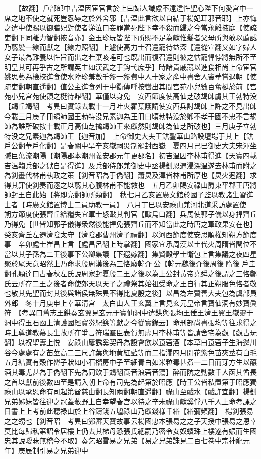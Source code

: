 　　【故翻】戶部郎中吉温因宦官言於上曰婦人識慮不遠違忤聖心陛下何愛宫中一席之地不使之就死豈忍辱之於外舍邪【吉温此言欲以自結于楊妃耳邪音耶】上亦悔之遣中使賜以御膳妃對使者涕泣曰妾罪當死陛下幸不殺而歸之今當永離掖庭【使疏吏翻下同離力智翻掖音亦】金玉珍玩皆陛下所賜不足為獻惟髪者父母所與敢以薦誠乃翦髪一繚而獻之【繚力照翻】上遽使高力士召還寵待益深【還從宣翻又如字婦人女子最為難養以忤旨而出之若棄咳唾可也既出而復召還則彼之怙寵悍悖將無所不至明皇其可再乎古之所謂英主如漢武之于鈎弋庶乎】時諸貴戚競以進食相尚上命宦官姚思藝為檢校進食使水陸珍羞數千盤一盤費中人十家之產中書舍人竇華嘗退朝【使疏吏翻朝直遥翻】值公主進食列于中衢傳呼按轡出其間宫苑小兒數百奮梃於前【宫苑小兒宫苑使領之梃待鼎翻】華僅以身免　安西節度使高仙芝破朅師虜其王勃特没【朅丘竭翻　考異曰實錄去載十一月吐火羅葉護請使安西兵討朅師上許之不見出師今載三月庚子冊朅師國王勃特没兄素迦為王冊曰頃勃特没於卿不孝于國不忠不言朅師為誰所破按十載正月高仙芝擒朅師王來獻然則朅師為仙芝所破也】三月庚子立勃特没之兄素迦為朅師王【迦音加】　上命御史大夫王鉷鑿華山路設壇場于其上【鉷戶公翻華戶化翻】是春關中旱辛亥嶽祠災制罷封西嶽　夏四月己巳御史大夫宋渾坐贓巨萬流潮陽【潮陽郡本潮州義安郡元年更郡名】初吉温因李林甫得進【天寶四載吉温鞫兵部之獄自是得進】及兵部侍郎兼御史中丞楊釗恩遇浸深温遂去林甫而附之為釗畫代林甫執政之策【釗音昭為于偽翻】蕭炅及渾皆林甫所厚也【炅火迥翻】求得其罪使釗奏而逐之以翦其心腹林甫不能救也　五月乙卯賜安祿山爵東平郡王唐將帥封王自此始【將即亮翻帥所類翻】　秋七月乙亥置廣文館於國子監以教諸生習進士者【時廣文館置博士二員助教一員】　八月丁巳以安祿山兼河北道采訪處置使　朔方節度使張齊丘給糧失宜軍士怒敺其判官【敺烏口翻】兵馬使郭子儀以身捍齊丘乃得免【世皆知郭子儀得衆然後能捍免張齊丘而不知當此之時唐之軍政果安在也】癸亥齊丘左遷濟陰太守【濟陰郡曹州濟子禮翻】以河西節度使安思順權知朔方節度事　辛卯處士崔昌上言【處昌呂翻上時掌翻】國家宜承周漢以土代火周隋皆閏位不當以其子孫為二王後事下公卿集議【下遐嫁翻】集賢殿學士衛包上言集議之夜四星聚於尾天意昭然上乃命求殷周漢後為三恪廢韓介公【韓元魏後介後周後隋後戶圭翻孔穎達曰古春秋左氏說周家封夏殷二王之後以為上公封黃帝堯舜之後謂之三恪鄭氏云所存二王之後者命使郊天以天子之禮祭其始祖受命之王自行其正朔服色恪者敬也敬其先聖而封其後與諸侯無殊異不得比夏殷之後】以昌為左贊善大夫包為虞部員外郎　冬十月庚申上幸華清宫　太白山人王玄翼上言見玄元皇帝言寶仙洞有妙寶眞符　【考異曰舊志王鉷奏玄翼見玄元于寶仙洞中遣鉷與張均王倕王濟王翼王嶽靈于洞中得玉石函上清護國經寶劵紀籙等獻之今從實錄云】命刑部尚書張均等往求得之時上尊道教慕長生故所在爭言符瑞羣臣表賀無虚月李林甫等皆請舍宅為觀【觀古玩翻】以祝聖夀上悦　安祿山屢誘奚契丹為設會飲以莨菪酒【本草曰莨菪子生海邊川谷今處處有之苖莖高二三尺許葉與地黄紅藍等而二指濶四月開花紫色苗夾莖有白毛五月結實有殻作罌子狀如小石榴房中子至細青白如米粒毒甚煮一二日而芽方生以釀酒其毒尤甚為于偽翻下先為同飲于鴆翻莨音浪菪音蕩】醉而阬之動數千人函其酋長之首以獻前後數四至是請入朝上命有司先為起第於昭應【時王公皆私置第于昭應獨祿山以承恩命有司起第酋慈由翻長知兩翻朝直遥翻】祿山至戲水【戲許宜翻】楊釗兄弟姊妹皆往迎之冠蓋蔽野上自幸望春宫以待之辛未祿山獻奚俘八千人上命考課之日書上上考前此聽禄山於上谷鑄錢五壚祿山乃獻錢様千緡【緡彌頻翻】　楊釗張易之之甥也【釗音昭　考異曰鄭審天寶故事云楊國忠本張易之之子天授中張易之恩幸莫比每歸私第詔令居樓上仍去其梯母恐張氏絶嗣乃密令女奴蠙珠上樓遂有娠而生國忠其說曖昧無稽今不取】奏乞昭雪易之兄弟【易之兄弟誅見二百七卷中宗神龍元年】庚辰制引易之兄弟迎中